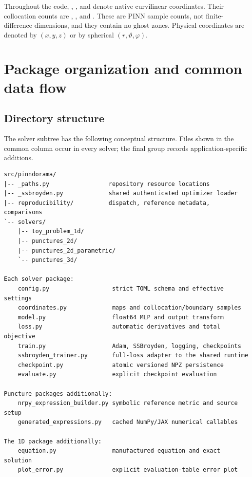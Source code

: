 \documentclass[11pt]{article}
\newcommand{\code}[1]{\texttt{\detokenize{#1}}}
\begin{document}
Throughout the code, \code{xx0}, \code{xx1}, and \code{xx2} denote native
curvilinear coordinates.  Their collocation counts are \code{Nxx0},
\code{Nxx1}, and \code{Nxx2}.  These are PINN sample counts, not
finite-difference dimensions, and they contain no ghost zones.  Physical
coordinates are denoted by $(x,y,z)$ or by spherical $(r,\vartheta,\varphi)$.

\section{Package organization and common data flow}

\subsection{Directory structure}

The solver subtree has the following conceptual structure.  Files shown in
the common column occur in every solver; the final group records
application-specific additions.

\begin{lstlisting}
src/pinndorama/
|-- _paths.py                 repository resource locations
|-- _ssbroyden.py             shared authenticated optimizer loader
|-- reproducibility/          dispatch, reference metadata, comparisons
`-- solvers/
    |-- toy_problem_1d/
    |-- punctures_2d/
    |-- punctures_2d_parametric/
    `-- punctures_3d/

Each solver package:
    config.py                  strict TOML schema and effective settings
    coordinates.py             maps and collocation/boundary samples
    model.py                   float64 MLP and output transform
    loss.py                    automatic derivatives and total objective
    train.py                   Adam, SSBroyden, logging, checkpoints
    ssbroyden_trainer.py       full-loss adapter to the shared runtime
    checkpoint.py              atomic versioned NPZ persistence
    evaluate.py                explicit checkpoint evaluation

Puncture packages additionally:
    nrpy_expression_builder.py symbolic reference metric and source setup
    generated_expressions.py   cached NumPy/JAX numerical callables

The 1D package additionally:
    equation.py                manufactured equation and exact solution
    plot_error.py              explicit evaluation-table error plot
\end{lstlisting}
\end{document}
